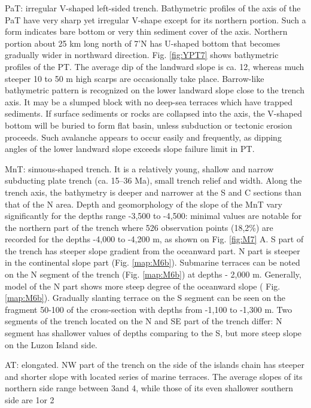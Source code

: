 \documentclass[11pt,a4paper]{report}
\begin{document}
{\ac{PaT}: irregular V-shaped left-sided trench. Bathymetric profiles of the axis of the \ac{PaT} have very sharp yet irregular V-shape except for its northern portion. Such a form indicates bare bottom or very thin sediment cover of the axis. Northern portion about 25 km long north of 7'N has U-shaped bottom that becomes gradually wider in northward direction. Fig. \ref{fig:YPT7} shows bathymetric profiles of the \ac{PT}. The average dip of the landward slope is ca. 12\degree, whereas much steeper 10 to 50 m high scarps are occasionally take place. Barrow-like bathymetric pattern is recognized on the lower landward slope close to the trench axis. It may be a slumped block with no deep-sea terraces which have trapped sediments. If surface sediments or rocks are collapsed into the axis, the V-shaped bottom will be buried to form flat basin, unless subduction or tectonic erosion proceeds. Such avalanche appears to occur easily and frequently, as dipping angles of the lower landward slope exceeds slope failure limit in \ac{PT}.

\ac{MnT}: sinuous-shaped trench. It is a relatively young, shallow and narrow subducting plate trench (ca. 15--36 Ma), small trench relief and width. Along the trench axis, the bathymetry is deeper and narrower at the S and C sections than that of the N area. Depth and geomorphology of the slope of the \ac{MnT} vary significantly for the depths range -3,500 to -4,500: minimal values are notable for the northern part of the trench where 526 observation points (18,2\%) are recorded for the depths -4,000 to -4,200 m, as shown on Fig. \ref{fig:M7} A. S part of the trench has steeper slope gradient from the oceanward part. N part is steeper in the continental slope part (Fig. \ref{map:M6b}). Submarine terraces can be noted on the N segment of the trench (Fig. \ref{map:M6b}) at depths - 2,000 m. Generally, model of the N part shows more steep degree of the oceanward slope ( Fig. \ref{map:M6b}). Gradually slanting terrace on the S segment can be seen on the fragment 50-100 of the cross-section with depths from -1,100 to -1,300 m. Two segments of the trench located on the N and SE part of the trench differ: N segment has shallower values of depths comparing to the S, but more steep slope on the Luzon Island side.

\ac{AT}: elongated. NW part of the trench on the side of the islands chain has steeper and shorter slope with located series of marine terraces. The average slopes of its northern side range between 3\degree\space and 4\degree, while those of its even shallower southern side are 1\degree\space or 2\degree 

}
\end{document}
